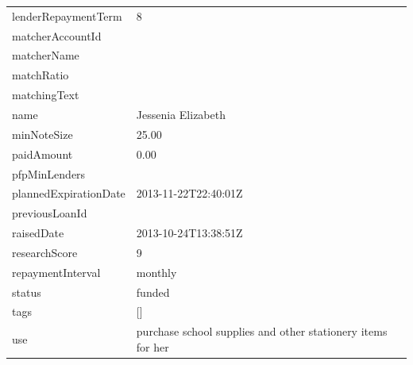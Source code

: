 \begin{longtable}{|p{}|p{}|}
	lenderRepaymentTerm                             & 8                                                                   \\
	matcherAccountId                                &                                                                     \\
	matcherName                                     &                                                                     \\
	matchRatio                                      &                                                                     \\
	matchingText                                    &                                                                     \\
	name                                            & Jessenia Elizabeth                                                  \\
	minNoteSize                                     & 25.00                                                               \\
	paidAmount                                      & 0.00                                                                \\
	pfpMinLenders                                   &                                                                     \\
	plannedExpirationDate                           & 2013-11-22T22:40:01Z                                                \\
	previousLoanId                                  &                                                                     \\
	raisedDate                                      & 2013-10-24T13:38:51Z                                                \\
	researchScore                                   & 9                                                                   \\
	repaymentInterval                               & monthly                                                             \\
	status                                          & funded                                                              \\
	tags                                            & {[}{]}                                                              \\
	use                                             & purchase school supplies and other stationery items for her

\end{longtable}

